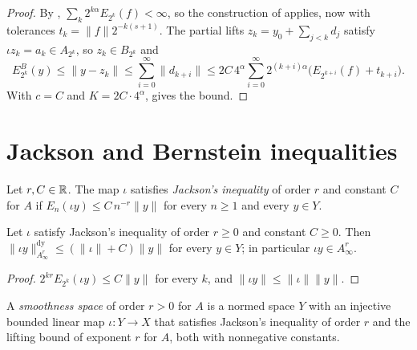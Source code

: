 \begin{proof}
\leanok
{}
By , $\sum_k 2^{k\alpha} E_{2^k}(f) < \infty$, so the
construction of  applies, now with tolerances $t_k = \|f\| 2^{-k(s+1)}$. The
partial lifts $z_k = y_0 + \sum_{j<k} d_j$ satisfy $\iota z_k = a_k \in A_{2^k}$, so
$z_k \in B_{2^k}$ and
\[
  E^B_{2^k}(y) \leq \|y - z_k\| \leq \sum_{i=0}^\infty \|d_{k+i}\|
  \leq 2C \, 4^\alpha \sum_{i=0}^\infty 2^{(k+i)\alpha} \bigl(E_{2^{k+i}}(f) + t_{k+i}\bigr).
\]
With $c = C$ and $K = 2C \cdot 4^\alpha$,  gives the bound.
\end{proof}

\section{Jackson and Bernstein inequalities}

\begin{definition}
\label{def:jackson}
\leanok
{}
Let $r, C \in \mathbb{R}$. The map $\iota$ satisfies \emph{Jackson's inequality} of order $r$ and
constant $C$ for $A$ if $E_n(\iota y) \leq C \, n^{-r} \|y\|$ for every $n \geq 1$ and every
$y \in Y$.
\end{definition}

\begin{lemma}
\label{lem:jackson-top}
\leanok
{}
Let $\iota$ satisfy Jackson's inequality of order $r \geq 0$ and constant $C \geq 0$. Then
$\|\iota y\|^{\mathrm{dy}}_{A^r_\infty} \leq (\|\iota\| + C) \|y\|$ for every $y \in Y$; in
particular $\iota y \in A^r_\infty$.
\end{lemma}

\begin{proof}
\leanok
$2^{kr} E_{2^k}(\iota y) \leq C \|y\|$ for every $k$, and $\|\iota y\| \leq \|\iota\| \|y\|$.
\end{proof}

\begin{definition}
\label{def:smoothness}
\leanok
{}
A \emph{smoothness space} of order $r > 0$ for $A$ is a normed space $Y$ with an injective
bounded linear map $\iota : Y \to X$ that satisfies Jackson's inequality of order $r$ and the
lifting bound of exponent $r$ for $A$, both with nonnegative constants.
\end{definition}


